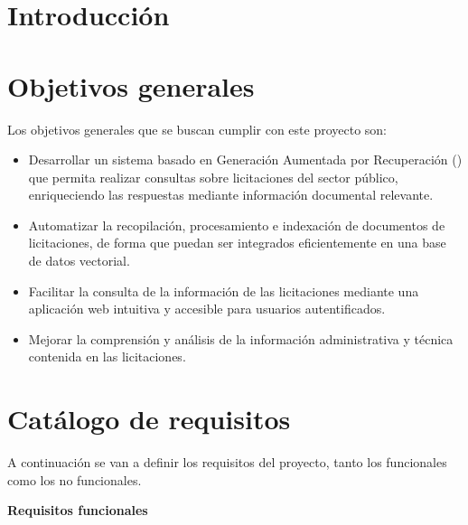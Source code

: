 
\section{Introducción}



\section{Objetivos generales}

Los objetivos generales que se buscan cumplir con este proyecto son:
\begin{itemize}
\tightlist
	\item Desarrollar un sistema basado en Generación Aumentada por Recuperación () que permita realizar consultas sobre licitaciones del sector público, enriqueciendo las respuestas mediante información documental relevante.
	\item Automatizar la recopilación, procesamiento e indexación de documentos de licitaciones, de forma que puedan ser integrados eficientemente en una base de datos vectorial.
	\item Facilitar la consulta de la información de las licitaciones mediante una aplicación web intuitiva y accesible para usuarios autentificados.
	\item Mejorar la comprensión y análisis de la información administrativa y técnica contenida en las licitaciones.
\end{itemize}

\section{Catálogo de requisitos}

A continuación se van a definir los requisitos del proyecto, tanto los funcionales como los no funcionales.

\textbf{Requisitos funcionales}

